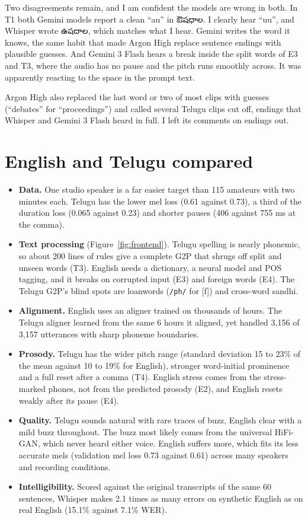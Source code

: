 \documentclass[11pt,a4paper]{article}
\newcommand{\te}[1]{{\telugufont #1}}
\newcommand{\ph}[1]{\texttt{/#1/}}
\begin{document}
Two disagreements remain, and I am confident the models are wrong in both. In T1 both Gemini models report a clean
“au” in \te{ఔషధాల}. I clearly hear “uu”, and Whisper wrote \te{ఉషదాల}, which matches what I hear. Gemini writes the word it knows, the same
habit that made Argon High replace sentence endings with plausible guesses. And Gemini 3 Flash hears a break
inside the split words of E3 and T3, where the audio has no pause and the pitch runs smoothly across. It was
apparently reacting to the space in the prompt text.

Argon High also replaced the last word or two of most clips with guesses (“debates” for “proceedings”) and
called several Telugu clips cut off, endings that Whisper and Gemini 3 Flash heard in full. I left its comments on
endings out.

\section{English and Telugu compared}
\begin{itemize}
\item \textbf{Data.} One studio speaker is a far easier target than 115 amateurs with two minutes each. Telugu has
  the lower mel loss (0.61 against 0.73), a third of the duration loss (0.065 against 0.23) and shorter pauses
  (406 against 755 ms at the comma).
\item \textbf{Text processing} (Figure~\ref{fig:frontend}). Telugu spelling is nearly phonemic, so about 200 lines
  of rules give a complete G2P that shrugs off split and unseen words (T3). English needs a dictionary, a neural
  model and POS tagging, and it breaks on corrupted input (E3) and foreign words (E4). The Telugu G2P's blind
  spots are loanwords (\ph{ph} for [f]) and cross-word sandhi.
\item \textbf{Alignment.} English uses an aligner trained on thousands of hours. The Telugu aligner learned from the
  same 6 hours it aligned, yet handled 3{,}156 of 3{,}157 utterances with sharp phoneme boundaries.
\item \textbf{Prosody.} Telugu has the wider pitch range (standard deviation 15 to 23\% of the mean against 10 to
  19\% for English), stronger word-initial prominence and a full reset after a comma (T4). English stress comes
  from the stress-marked phones, not from the predicted prosody (E2), and English resets weakly after its pause
  (E4).
\item \textbf{Quality.} Telugu sounds natural with rare traces of buzz, English clear with a mild buzz throughout.
  The buzz most likely comes from the universal HiFi-GAN, which never heard either voice. English suffers more,
  which fits its less accurate mels (validation mel loss 0.73 against 0.61) across many speakers and recording
  conditions.
\item \textbf{Intelligibility.} Scored against the original transcripts of the same 60 sentences, Whisper makes
  2.1 times as many errors on synthetic English as on real English (15.1\% against 7.1\% WER).
\end{itemize}
\end{document}
